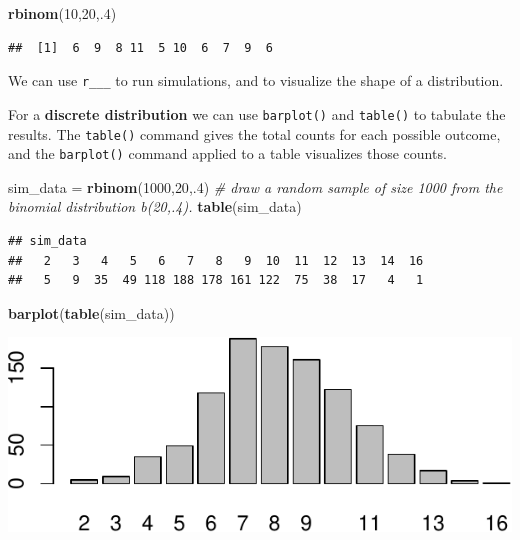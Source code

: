 \documentclass[
]{book}
\newenvironment{Shaded}{\begin{snugshade}}{\end{snugshade}}
\newcommand{\CommentTok}[1]{\textcolor[rgb]{0.56,0.35,0.01}{\textit{#1}}}
\newcommand{\DecValTok}[1]{\textcolor[rgb]{0.00,0.00,0.81}{#1}}
\newcommand{\FunctionTok}[1]{\textcolor[rgb]{0.13,0.29,0.53}{\textbf{#1}}}
\newcommand{\NormalTok}[1]{#1}
\newcommand{\OtherTok}[1]{\textcolor[rgb]{0.56,0.35,0.01}{#1}}
\theoremstyle{definition}
\theoremstyle{definition}
\theoremstyle{definition}
\theoremstyle{definition}
\theoremstyle{remark}
\begin{document}
\begin{Shaded}
\begin{Highlighting}[]
\FunctionTok{rbinom}\NormalTok{(}\DecValTok{10}\NormalTok{,}\DecValTok{20}\NormalTok{,.}\DecValTok{4}\NormalTok{)}
\end{Highlighting}
\end{Shaded}

\begin{verbatim}
##  [1]  6  9  8 11  5 10  6  7  9  6
\end{verbatim}

We can use \texttt{r\_\_\_} to run simulations, and to visualize the shape of a distribution.

For a \textbf{discrete distribution} we can use \texttt{barplot()} and \texttt{table()} to tabulate the results. The \texttt{table()} command gives the total counts for each possible outcome, and the \texttt{barplot()} command applied to a table visualizes those counts.

\begin{Shaded}
\begin{Highlighting}[]
\NormalTok{sim\_data }\OtherTok{=} \FunctionTok{rbinom}\NormalTok{(}\DecValTok{1000}\NormalTok{,}\DecValTok{20}\NormalTok{,.}\DecValTok{4}\NormalTok{) }\CommentTok{\# draw a random sample of size 1000 from the binomial distribution b(20,.4).}
\FunctionTok{table}\NormalTok{(sim\_data)}
\end{Highlighting}
\end{Shaded}

\begin{verbatim}
## sim_data
##   2   3   4   5   6   7   8   9  10  11  12  13  14  16 
##   5   9  35  49 118 188 178 161 122  75  38  17   4   1
\end{verbatim}

\begin{Shaded}
\begin{Highlighting}[]
\FunctionTok{barplot}\NormalTok{(}\FunctionTok{table}\NormalTok{(sim\_data))}
\end{Highlighting}
\end{Shaded}

\includegraphics{math340-notes_files/figure-latex/unnamed-chunk-151-1.pdf}
\end{document}
